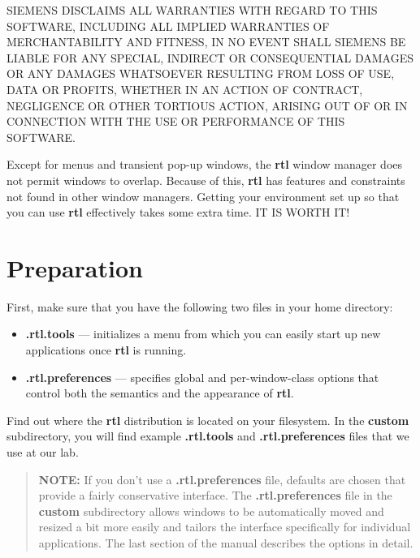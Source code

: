 \begin{titlepage}
\noindent SIEMENS DISCLAIMS ALL WARRANTIES WITH REGARD TO THIS SOFTWARE, INCLUDING
ALL IMPLIED WARRANTIES OF MERCHANTABILITY AND FITNESS, IN NO EVENT SHALL
SIEMENS BE LIABLE FOR ANY SPECIAL, INDIRECT OR CONSEQUENTIAL DAMAGES OR
ANY DAMAGES WHATSOEVER RESULTING FROM LOSS OF USE, DATA OR PROFITS,
WHETHER IN AN ACTION OF CONTRACT, NEGLIGENCE OR OTHER TORTIOUS ACTION,
ARISING OUT OF OR IN CONNECTION WITH THE USE OR PERFORMANCE OF THIS
SOFTWARE.

\end{titlepage}

Except for menus and transient pop-up windows,
the {\bf rtl} window manager does not permit windows to overlap.
Because of this, {\bf rtl} has features and
constraints not found in other window managers.
Getting your environment set up so that you can use {\bf rtl} effectively
takes some extra time.  IT IS WORTH IT!

\section{Preparation}

First, make sure that you have the following two files in your
home directory:

\begin{itemize}
\item {\bf .rtl.tools} --- initializes a menu from which you can easily
start up new applications once {\bf rtl} is running.

\item {\bf .rtl.preferences} --- specifies global and per-window-class options
that control both the semantics and the appearance of {\bf rtl}.
\end{itemize}

Find out where the {\bf rtl} distribution is located on your filesystem.
In the {\bf custom} subdirectory, you will find example
{\bf .rtl.tools} and {\bf .rtl.preferences} files that we use at our lab.

\begin{quotation}
{\bf NOTE:}
If you don't use a {\bf .rtl.preferences} file, defaults are chosen that
provide a fairly conservative interface.  The {\bf .rtl.preferences} file in
the {\bf custom} subdirectory allows windows to be automatically moved
and resized a bit more easily and tailors the interface specifically
for individual applications.  The last section of the manual describes the
options in detail.
\end{quotation}


